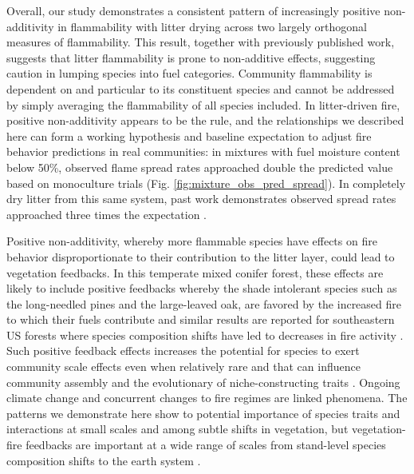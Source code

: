 \documentclass[fire,article,submit,moreauthors,pdftex]{Definitions/mdpi}
\begin{document}
Overall, our study demonstrates a consistent pattern of increasingly positive
non-additivity in flammability with litter drying across two largely orthogonal
measures of flammability. This result, together with previously published work,
suggests that litter flammability is prone to non-additive effects, suggesting
caution in lumping species into fuel categories. Community flammability is
dependent on and particular to its constituent species and cannot be addressed
by simply averaging the flammability of all species included. In litter-driven
fire, positive non-additivity appears to be the rule, and the relationships we
described here can form a working hypothesis and baseline expectation to adjust
fire behavior predictions in real communities: in mixtures with fuel moisture
content below 50\%, observed flame spread rates approached double the predicted
value based on monoculture trials (Fig. \ref{fig:mixture_obs_pred_spread}). In
completely dry litter from this same system, past work demonstrates observed
spread rates approached three times the expectation
\cite{Magalhaes+Schwilk-2012}.

Positive non-additivity, whereby more flammable species have effects on fire
behavior disproportionate to their contribution to the litter layer, could lead
to vegetation feedbacks. In this temperate mixed conifer forest, these effects
are likely to include positive feedbacks whereby the shade intolerant species
such as the long-needled pines and the large-leaved oak, are favored by the
increased fire to which their fuels contribute \cite{Schwilk+Caprio-2011} and
similar results are reported for southeastern US forests where species
composition shifts have led to decreases in fire activity
\citep{Nowacki+Abrams-2008}. Such positive feedback effects increases the
potential for species to exert community scale effects even when relatively
rare and that can influence community assembly and the evolutionary of
niche-constructing traits \cite{Kerr+Schwilk+etal-1999, Schwilk+Kerr-2002}.
Ongoing climate change and concurrent changes to fire regimes are linked
phenomena. The patterns we demonstrate here show to potential importance of species
traits and interactions at small scales and among subtle shifts in vegetation,
but vegetation-fire feedbacks are important at a wide range of scales from stand-level species composition shifts to the earth system \cite{Harris+Remenyi+etal-2016, Archibald+Lehmann+etal-2018}.


\vspace{6pt} 
\end{document}
